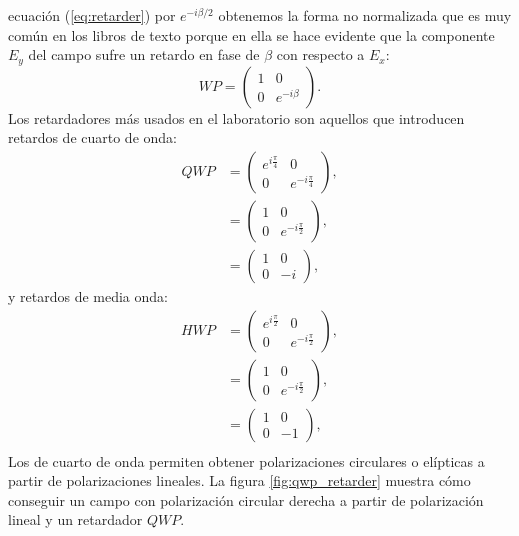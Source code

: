 ecuación (\ref{eq:retarder}) por $e^{-i\beta/2} $ 
obtenemos la forma no normalizada que es muy común en los libros de
texto porque en ella se hace evidente que la componente $E_y$ del campo sufre un
retardo en fase de $\beta$ con respecto a $E_x$: 
\begin{equation*}
WP = 
\begin{pmatrix}
1& 0 \\0&e^{-i\beta}  
\end{pmatrix}.
\label{eq:retarder_2}
\end{equation*}
Los retardadores más usados en el laboratorio son aquellos que
introducen retardos de cuarto de onda:
\begin{align*}
QWP &= \begin{pmatrix} e^{i\frac{\pi}{4}}  &0\\0&e^{-i\frac{\pi}{4}}\end{pmatrix},\\
&=  \begin{pmatrix} 1 &0\\0&e^{-i\frac{\pi}{2}}\end{pmatrix},\\
&=  \begin{pmatrix} 1 &0\\0&-i\end{pmatrix},
\end{align*}
y retardos de
media onda:
\begin{align*}
HWP &= \begin{pmatrix} e^{i\frac{\pi}{2}}  &0\\0&e^{-i\frac{\pi}{2}}\end{pmatrix},\\
&=  \begin{pmatrix} 1 &0\\0&e^{-i\frac{\pi}{2}}\end{pmatrix},\\
&=  \begin{pmatrix} 1 &0\\0&-1\end{pmatrix},\\
\end{align*}
Los de cuarto de onda permiten obtener polarizaciones
circulares o elípticas a partir de polarizaciones lineales. La figura
\ref{fig:qwp_retarder} muestra cómo conseguir un campo con
polarización circular derecha a partir de polarización lineal y un 
retardador $QWP$.

